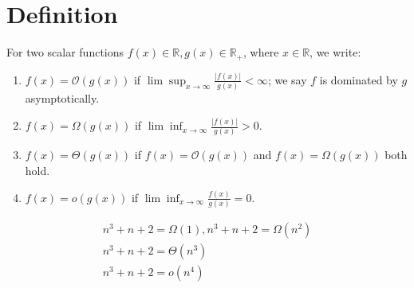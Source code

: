 \documentclass[11pt]{elegantbook}
\begin{document}
\section{Definition}
\begin{center}
\end{center}
For two scalar functions $f(x)\in \mathbb{R}, g(x)\in \mathbb{R}_+$, where $x\in \mathbb{R}$, we write:
\begin{enumerate}
    \item $f(x)=\mathcal{O}(g(x))$ if $\lim \sup_{x \rightarrow	\infty}\frac{|f(x)|}{g(x)}<\infty$; we say $f$ is dominated by $g$ asymptotically.
    \item $f(x)=\Omega(g(x))$ if $\lim \inf_{x \rightarrow \infty}\frac{|f(x)|}{g(x)}>0$.
    \item $f(x)=\Theta (g(x))$ if $f(x)=\mathcal{O}(g(x))$ and $f(x)=\Omega(g(x))$ both hold.
    \item $f(x)=o(g(x))$ if $\lim \inf_{x \rightarrow \infty}\frac{f(x)}{g(x)}=0$.
\end{enumerate}

\begin{example}
\begin{equation}
    \begin{aligned}
        n^3+n+2=\Omega(1),n^3+n+2=\Omega(n^2)\\
        n^3+n+2=\Theta(n^3)\\
        n^3+n+2=o(n^4)
    \end{aligned}
    \nonumber
\end{equation}
\end{example}
\end{document}
